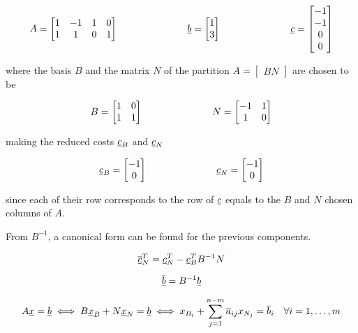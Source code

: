 $$
A=
\begin{bmatrix}
    1 & -1 & 1 & 0 \\
    1 & 1 & 0 & 1
\end{bmatrix}
\hspace{2.5cm}
\underline{b}=
\begin{bmatrix}
    1 \\ 3
\end{bmatrix}
\hspace{2.5cm}
\underline{c}=
\begin{bmatrix}
    -1 \\ -1 \\ 0 \\ 0
\end{bmatrix}
$$

where the basis $B$ and the matrix $N$ of the partition $A = \begin{bmatrix} B N \end{bmatrix}$ are chosen to be

$$
B=
\begin{bmatrix}
    1 & 0 \\
    1 & 1
\end{bmatrix}
\hspace{2.5cm}
N=
\begin{bmatrix}
    -1 & 1 \\
    1 & 0
\end{bmatrix}
$$

making the reduced costs $\underline{c}_B$ and $\underline{c}_N$

$$
\underline{c}_B =
\begin{bmatrix}
    -1 \\ 0
\end{bmatrix}
\hspace{2.5cm}
\underline{c}_N =
\begin{bmatrix}
    -1 \\ 0
\end{bmatrix}
$$

since each of their row corresponds to the row of $\underline{c}$ equals to the $B$ and $N$ chosen columns of $A$.

From $B^{-1}$, a canonical form can be found for the previous components.

$$
\overline{\underline{c}}_N^T = \underline{c}_N^T - \underline{c}_B^T B^{-1} N
$$

$$
\overline{\underline{b}} = B^{-1} \underline{b}
$$

$$
A \underline{x} = \underline{b} \iff B \underline{x}_B + N \underline{x}_N = \underline{b} \iff x_{B_i} + \sum_{j=1}^{n-m} \overline{a}_{ij} x_{N_j} = \overline{b}_i \hspace{1em}\forall i = 1, \dots, m
$$

